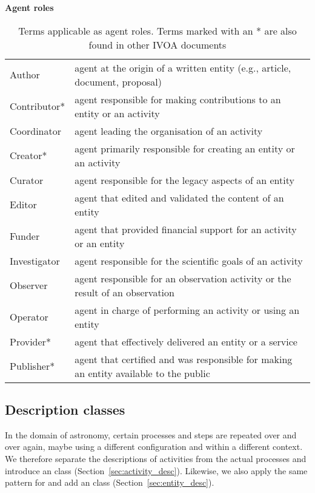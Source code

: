 \begin{table}[ht]
\small
{}\textwidth
\textbf{\normalsize Agent roles}\vspace{0.25em}\\
\begin{tabulary}{1.0\textwidth}{lp{8cm}}
\toprule
{} &  \\
\midrule
Author       & agent at the origin of a written entity (e.g., article, document, proposal) \\
Contributor* & agent responsible for making contributions to an entity or an activity \\
Coordinator  & agent leading the organisation of an activity \\
Creator*     & agent primarily responsible for creating an entity or an activity \\
Curator      & agent responsible for the legacy aspects of an entity \\
Editor       & agent that edited and validated the content of an entity \\
Funder       & agent that provided financial support for an activity or an entity \\
Investigator & agent responsible for the scientific goals of an activity \\
Observer     & agent responsible for an observation activity or the result of an observation \\
Operator     & agent in charge of performing an activity or using an entity \\
Provider*    & agent that effectively delivered an entity or a service \\
Publisher*   & agent that certified and was responsible for making an entity available to the public \\
\bottomrule
\end{tabulary}
\caption[Terms applicable as agent roles.]{Terms applicable as agent roles. Terms marked with an * are also found in other IVOA documents \citep[e.g.,][]{2007ivoa.spec.0302H,2017ivoa.spec.0524G}}
\label{tab:agent-roles}
\end{table}




\subsection{Description classes}
\label{sec:descriptions}

In the domain of astronomy, certain processes and steps are repeated over and over again, maybe using a different configuration and within a different context. 
We therefore separate the descriptions of activities from the actual processes and introduce an  class (Section~\ref{sec:activity_desc}). 
Likewise, we also apply the same pattern for  and add an  class (Section~\ref{sec:entity_desc}). 


